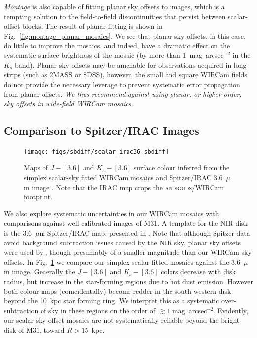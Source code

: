 \documentclass[iop]{emulateapj}
\newcommand{\sw}[1]{\textit{#1}} %
\newcommand{\androids}{\textsc{androids}}
\newcommand{\Fig}[1]{Fig.~\ref{fig:#1}}  %
\begin{document}
\sw{Montage} is also capable of fitting planar sky offsets to images, which is a tempting solution to the field-to-field discontinuities that persist between scalar-offset blocks.
The result of planar fitting is shown in \Fig{montage_planar_mosaics}.
We see that planar sky offsets, in this case, do little to improve the mosaics, and indeed, have a dramatic effect on the systematic surface brightness of the mosaic (by more than 1~mag~arcsec$^{-2}$ in the $K_s$ band).
Planar sky offsets may be amenable for observations acquired in long strips (such as 2MASS or SDSS), however, the small and square WIRCam fields do not provide the necessary leverage to prevent systematic error propagation from planar offsets.
\textit{We thus recommend against using planar, or higher-order, sky offsets in wide-field WIRCam mosaics.}

\subsection{Comparison to Spitzer/IRAC Images}

\begin{figure}[t]
\centering
\texttt{[image: figs/sbdiff/scalar\_irac36\_sbdiff]}
\caption{Maps of $J-[3.6]$ and $K_s-[3.6]$ surface colour inferred from the simplex scalar-sky fitted WIRCam mosaics and Spitzer/IRAC 3.6~$\mu$m image \citep{Barmby:2006}.
Note that the IRAC map crops the \androids/WIRCam footprint.}
\label{fig:scalar_irac36_sbdiff}
\end{figure}

We also explore systematic uncertainties in our WIRCam mosaics with comparisons against well-calibrated images of M31.
A template for the NIR disk is the 3.6~$\mu$m Spitzer/IRAC map, presented in \cite{Barmby:2006}.
Note that although Spitzer data avoid background subtraction issues caused by the NIR sky, planar sky offsets were used by \citeauthor{Barmby:2006}, though presumably of a smaller magnitude than our WIRCam sky offsets.
In \Fig{scalar_irac36_sbdiff} we compare our simplex scalar-fitted mosaics against the 3.6~$\mu$m image.
Generally the $J-[3.6]$ and $K_s-[3.6]$ colors decrease with disk radius, but increase in the star-forming regions due to hot dust emission.
However both colour maps (coincidentally) become redder in the south western disk beyond the 10~kpc star forming ring.
We interpret this as a systematic over-subtraction of sky in these regions on the order of $\gtrsim 1$ mag~arcsec$^{-2}$.
Evidently, our scalar sky offset mosaics are not systematically reliable beyond the bright disk of M31, toward $R>15$~kpc.
\end{document}
